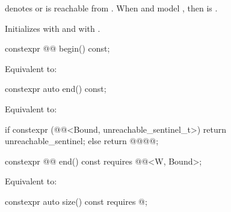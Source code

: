 \begin{itemdescr}
\pnum
\expects
{} denotes  or
 is reachable from .
When  and  model ,
then  is .

\pnum
\effects
Initializes  with  and
 with .
\end{itemdescr}

%
\begin{itemdecl}
constexpr @@ begin() const;
\end{itemdecl}

\begin{itemdescr}
\pnum
\effects
Equivalent to: 
\end{itemdescr}

%
\begin{itemdecl}
constexpr auto end() const;
\end{itemdecl}

\begin{itemdescr}
\pnum
\effects
Equivalent to:
\begin{codeblock}
if constexpr (@@<Bound, unreachable_sentinel_t>)
  return unreachable_sentinel;
else
  return @@{@@};
\end{codeblock}
\end{itemdescr}

%
\begin{itemdecl}
constexpr @@ end() const requires @@<W, Bound>;
\end{itemdecl}

\begin{itemdescr}
\pnum
\effects
Equivalent to: 
\end{itemdescr}

%
\begin{itemdecl}
constexpr auto size() const requires @\seebelow@;
\end{itemdecl}

